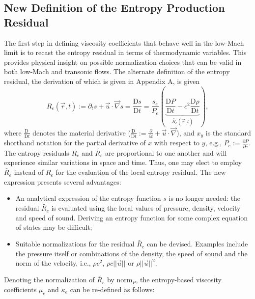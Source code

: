 \documentclass[preprint,10pt]{elsarticle}
\newcommand{\grad}{\vec{\nabla}}
\newcommand{\norm}{\textrm{norm}}
\newcommand{\resi}{R_e}
\newcommand{\resinew}{\widetilde{\resi}}
\newcommand{\matder}[1]{\frac{\textrm{D} #1}{\textrm{D} t}}
\newcommand{\eqt}[1]{Eq.~(\ref{#1})}                     %
\newcommand{\app}[1]{Appendix~\ref{#1}}                   %
\begin{document}
\subsection{New Definition of the Entropy Production Residual}\label{sec:new_ent_prod} 

The first step in defining viscosity coefficients that behave well in the low-Mach limit is to recast the entropy residual in terms of thermodynamic variables. This provides physical insight on possible normalization choices that can be valid in both low-Mach and transonic flows. The alternate definition of the entropy residual, the derivation of which is given in Appendix A, is given %
%
\begin{equation}
\label{eq:ent_res}
\resi(\vec{r},t) := \partial_t s + \vec{u} \cdot \grad s = \matder{s} = \frac{s_e}{P_e} \left( \underbrace{\matder{P} - c^2 \matder{\rho} }_{\resinew(\vec{r},t)} \right) ,
\end{equation} 
%
where $\matder{\ }$ denotes the material derivative ($\matder{\ }:= \frac{\partial}{\partial t} + \vec{u} \cdot \grad$), and $x_y$ is the standard shorthand notation for the partial derivative of $x$ with respect to $y$, e.g., $P_e:=\frac{\partial P}{\partial e}$. 
%
The entropy residuals $\resi$ and $\resinew$ are proportional to one another and will experience similar variations in space and time. Thus, one may elect to employ $\resinew$ instead of $\resi$ for the evaluation of the local entropy residual. The new expression presents several advantages:
%
\begin{itemize}
\item An analytical expression of the entropy function $s$ is no longer needed: the residual $\resinew$ is evaluated using the local values of pressure, density, velocity and speed of sound. Deriving an entropy function for some complex equation of states may be difficult;
\item Suitable normalizations for the residual $\resinew$ can be devised. Examples include the pressure itself or combinations of the density, the speed of sound and the norm of the velocity, i.e., $\rho c^2$, $\rho c || \vec{u} ||$ or $\rho || \vec{u} ||^2$. 
\end{itemize}
%
Denoting the normalization of $\resinew$ by $\norm_P$, the entropy-based viscosity coefficients $\mu_e$ and $\kappa_e$ can be re-defined as follows:
\end{document}
